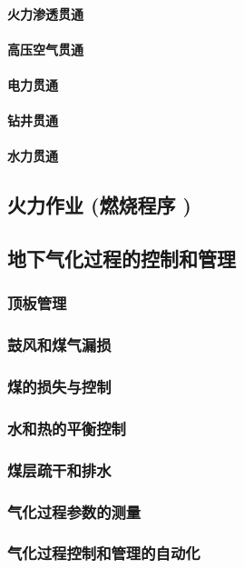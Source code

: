 \documentclass[UTF8]{../../ApplicationUniverse}
\begin{document}
            \paragraph{火力渗透贯通}
            \paragraph{高压空气贯通}
            \paragraph{电力贯通}
            \paragraph{钻井贯通}
            \paragraph{水力贯通}
    \subsection{火力作业 (燃烧程序 )}
    \subsection{地下气化过程的控制和管理}
        \subsubsection{顶板管理}
        \subsubsection{鼓风和煤气漏损}
        \subsubsection{煤的损失与控制}
        \subsubsection{水和热的平衡控制}
        \subsubsection{煤层疏干和排水}
        \subsubsection{气化过程参数的测量}
        \subsubsection{气化过程控制和管理的自动化}
\end{document}
